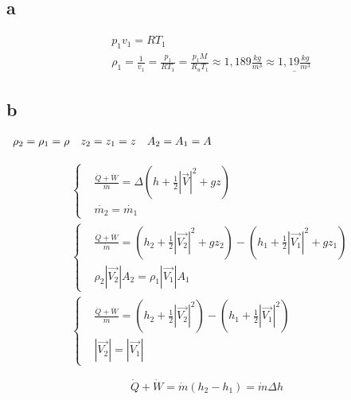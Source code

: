 \documentclass[12pt,a4paper,finnish]{article}
\begin{document}
\subsection{a}

\begin{align}
 &p_1v_1 = RT_1\\
 &\rho_1 = \frac{1}{v_1} = \frac{p_1}{RT_1} = \frac{p_1M}{R_uT_1} \approx 1,189 \frac{kg}{m^3} \approx \underline{1,19 \frac{kg}{m^3}}
\end{align}

\subsection{b}

\begin{math}
 \begin{array}{l l l}
  \rho_2  = \rho_1 = \rho & z_2 = z_1 = z & A_2 = A_1 = A
 \end{array}
\end{math}

\begin{align}
 &\left\{
 \begin{aligned}
  &\frac{\dot{Q} + \dot{W}}{\dot{m}} = \Delta\left(h + \frac{1}{2}|\vec{V}|^2 + gz\right)\\
  &\dot{m_2} = \dot{m_1}
 \end{aligned}\right.\\
 &\left\{
 \begin{aligned}
  &\frac{\dot{Q} + \dot{W}}{\dot{m}} = \left(h_{2} + \frac{1}{2}|\vec{V_{2}}|^2 + gz_{2}\right) - 
    \left(h_{1} + \frac{1}{2}|\vec{V_{1}}|^2 + gz_{1}\right)\\
  &\rho_2|\vec{V_2}|A_2 = \rho_1|\vec{V_1}|A_1
 \end{aligned}\right.\\
 &\left\{
 \begin{aligned}
  &\frac{\dot{Q} + \dot{W}}{\dot{m}} = \left(h_{2} + \frac{1}{2}|\vec{V_{2}}|^2\right) - 
    \left(h_{1} + \frac{1}{2}|\vec{V_{1}}|^2\right)\\
  &|\vec{V_2}| = |\vec{V_1}|
 \end{aligned}\right.
\end{align}

\begin{framed}
 \begin{equation}
  \dot{Q} + \dot{W} = \dot{m}(h_2 - h_1) = \dot{m}\Delta h
 \end{equation}
\end{framed}
\end{document}
